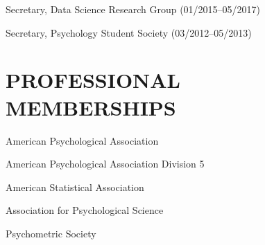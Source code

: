 \documentclass[
  12 pt,
]{article}
\begin{document}
Secretary, Data Science Research Group (01/2015--05/2017)

Secretary, Psychology Student Society (03/2012--05/2013)

\hypertarget{professional-memberships}{%
\section{PROFESSIONAL MEMBERSHIPS}\label{professional-memberships}}

American Psychological Association

American Psychological Association Division 5

American Statistical Association

Association for Psychological Science

Psychometric Society
\end{document}
